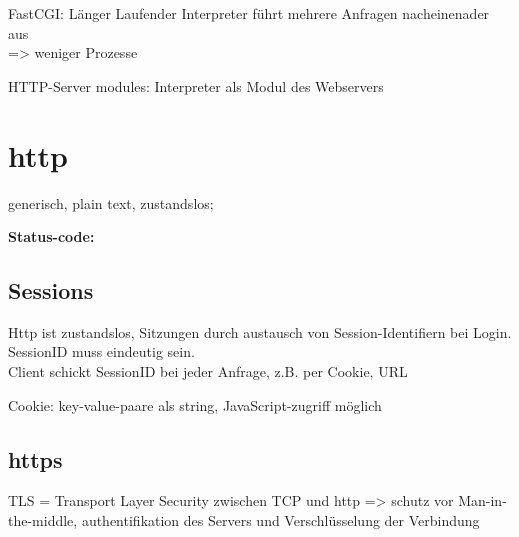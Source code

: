 FastCGI: Länger Laufender Interpreter führt mehrere Anfragen nacheinenader aus \\=> weniger Prozesse

HTTP-Server modules: Interpreter als Modul des Webservers
\section{http}
generisch, plain text, zustandslos;

\textbf{Status-code:}

\subsection{Sessions}
Http ist zustandslos, Sitzungen durch austausch von Session-Identifiern bei Login. \\
SessionID muss eindeutig sein. \\
Client schickt SessionID bei jeder Anfrage, z.B. per Cookie, URL

Cookie: key-value-paare als string, JavaScript-zugriff möglich
\subsection{https}
TLS = Transport Layer Security zwischen TCP und http => schutz vor Man-in-the-middle, authentifikation des Servers und Verschlüsselung der Verbindung

